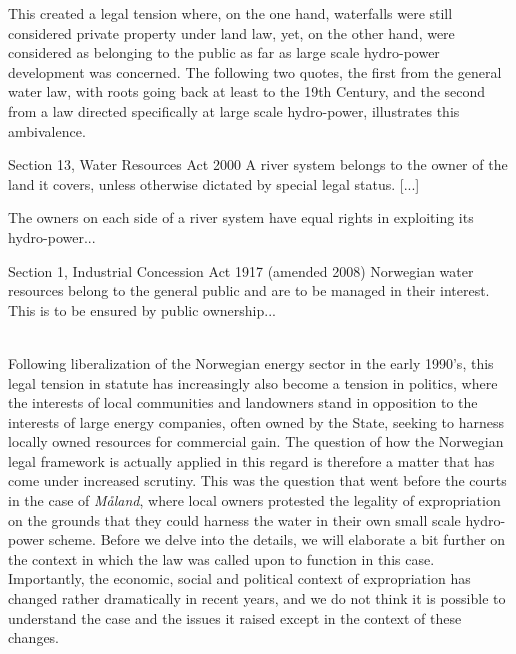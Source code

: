 This created a legal tension where, on the one hand, waterfalls were still considered private property under land law, yet, on the other hand, were considered as belonging to the public as far as large scale hydro-power development was concerned. The following two quotes, the first from the general water law, with roots going back at least to the 19th Century, and the second  from a law directed specifically at large scale hydro-power, illustrates this ambivalence.

{\begin{minipage}[t]{16em}
 \begin{aquote}{\tiny Section 13, Water Resources Act 2000} \footnotesize A river system belongs to the owner of the land it covers, unless otherwise dictated by special legal status. [...]

The owners on each side of a river system have equal rights in exploiting its hydro-power...
\end{aquote}  
\end{minipage}}
{\begin{minipage}[t]{22em}
\begin{aquote}{\tiny Section 1, Industrial Concession Act 1917 (amended 2008)} \footnotesize Norwegian water resources belong to the general public and are to be managed in their interest. This is to be ensured by public ownership...
\end{aquote}
\end{minipage}} \\

Following liberalization of the Norwegian energy sector in the early 1990's, this legal tension in statute has increasingly also become a tension in politics, where the interests of local communities and landowners stand in opposition to the interests of large energy companies, often owned by the State, seeking to harness locally owned resources for commercial gain. The question of how the Norwegian legal framework is actually applied in this regard is therefore a matter that has come under increased scrutiny. This was the question that went before the courts in the case of \emph{Måland}, where local owners protested the legality of expropriation on the grounds that they could harness the water in their own small scale hydro-power scheme. Before we delve into the details, we will elaborate a bit further on the context in which the law was called upon to function in this case. Importantly, the economic, social and political context of expropriation has changed rather dramatically in recent years, and we do not think it is possible to understand the case and the issues it raised except in the context of these changes. 

